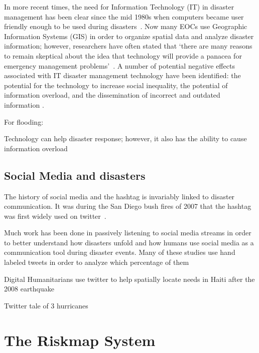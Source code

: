 In more recent times, the need for Information Technology (IT) in disaster
management has been clear since the mid 1980s when computers became user
friendly enough to be used during
disasters~\cite{universityTerminalDisastersComputer1986}. Now many EOCs use
Geographic Information Systems (GIS) in order to organize spatial data and
analyze disaster information; however, researchers have often stated that `there
are many reasons to remain skeptical about the idea that technology will provide
a panacea for emergency management problems'~\cite{tzemosUseGISFederal1995,
tierneyFacingUnexpectedDisaster2001, perryNaturalDisasterManagement2007}.
A number of potential negative effects associated with
IT disaster management technology have been identified: the potential for the
technology to increase social inequality, the potential of information overload,
and the dissemination of incorrect and outdated information
\cite{quarantelliProblematicalAspectsInformation1997,
flentgeDesigningContextAwareHCI}.


For flooding:~\cite{ahernGlobalHealthImpacts2005}

Technology can help disaster response; however, it also has the ability to cause
information overload\cite{tierneyFacingUnexpectedDisaster2001}

\subsection{Social Media and disasters}
	The history of social media and the hashtag is invariably linked to
	disaster communication.  It was during the San Diego bush fires of 2007
	that the hashtag was first widely used on
	twitter~\cite{salazarHashtagsAnnotatedHistory2017}.
	
	Much work has been done in passively listening to social media streams in order
	to better understand how disasters unfold and how humans use social media as a
	communication tool during disaster events. Many of these studies use hand
	labeled tweets in order to analyze which percentage of them 
	
	Digital Humanitarians use twitter to help spatially locate needs in Haiti after
	the 2008 earthquake~\cite{meierDigitalHumanitariansHow2015}
	
	Twitter tale of 3 hurricanes~\cite{alamTwitterTaleThree2018}



\section{The Riskmap System}\label{chap1:riskmap}


